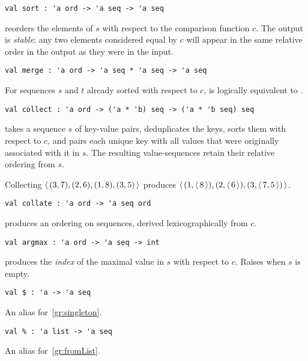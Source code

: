 \begin{gram}[sort]
\label{gr:sort}
\begin{verbatim}
val sort : 'a ord -> 'a seq -> 'a seq
\end{verbatim}
 reorders the elements of $s$ with respect to the comparison
function $c$. The output is \emph{stable}: any two elements considered equal
by $c$ will appear in the same relative order in the output as they were
in the input.
\end{gram}

\begin{gram}[merge]
\label{gr:merge}
\begin{verbatim}
val merge : 'a ord -> 'a seq * 'a seq -> 'a seq
\end{verbatim}
For sequences $s$ and $t$ already sorted with respect to $c$,
 is logically equivalent to .
\end{gram}

\begin{flex}
\begin{gram}[collect]
\label{gr:collect}
\begin{verbatim}
val collect : 'a ord -> ('a * 'b) seq -> ('a * 'b seq) seq
\end{verbatim}
 takes a sequence $s$ of key-value pairs, deduplicates the
keys, sorts them with respect to $c$, and pairs each unique key with all values
that were originally associated with it in $s$. The resulting value-sequences
retain their relative ordering from $s$.
\end{gram}
\begin{example}
Collecting $\left\langle\, (3,7),(2,6),(1,8),(3,5) \,\right\rangle$ produces
$\left\langle\, (1,\left\langle\, 8 \,\right\rangle), (2, \left\langle\, 6 \,\right\rangle), (3,\left\langle\, 7,5 \,\right\rangle) \,\right\rangle$.
\end{example}
\end{flex}

\begin{gram}[collate]
\label{gr:collate}
\begin{verbatim}
val collate : 'a ord -> 'a seq ord
\end{verbatim}
 produces an ordering on sequences, derived lexicographically
from $c$.
\end{gram}

\begin{gram}[argmax]
\label{gr:argmax}
\begin{verbatim}
val argmax : 'a ord -> 'a seq -> int
\end{verbatim}
 produces the \emph{index} of the maximal value in $s$
with respect to $c$. Raises  when $s$ is empty.
\end{gram}

\begin{gram}[\$]
\begin{verbatim}
val $ : 'a -> 'a seq
\end{verbatim}
An alias for~\ref{gr:singleton}.
\end{gram}

\begin{gram}[\%]
\begin{verbatim}
val % : 'a list -> 'a seq
\end{verbatim}
An alias for~\ref{gr:fromList}.
\end{gram}

